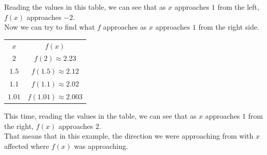 \documentclass{article}
\begin{document}
Reading the values in this table, we can see that as $x$ approaches $1$ from the left, $f(x)$ approaches $-2$.
\\Now we can try to find what $f$ approaches as $x$ approaches $1$ from the right side.
\begin{center}
    \begin{tabular} { c|c }
        $x$ & $f(x)$\\
        \cline{1-2}
        $2$ & $f(2) \approx 2.23$\\
        $1.5$ & $f(1.5) \approx 2.12$\\
        $1.1$ & $f(1.1) \approx 2.02$\\
        $1.01$ & $f(1.01) \approx 2.003$
    \end{tabular}
\end{center}
This time, reading the values in the table, we can see that as $x$ approaches $1$ from the right, $f(x)$
approaches $2$.
\\That means that in this example, the direction we were approaching from with $x$ affected where
$f(x)$ was approaching.
\end{document}
